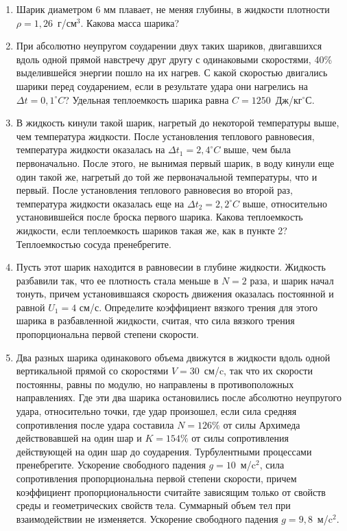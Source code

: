 
\begin{enumerate}
    \item Шарик диаметром 6 мм плавает, не меняя глубины, в жидкости плотности $\rho=1,26$~г/см$^3$. Какова масса шарика?
    \item При абсолютно неупругом соударении двух таких шариков, двигавшихся вдоль одной прямой навстречу друг другу с одинаковыми скоростями, 
    40\% выделившейся энергии пошло на их нагрев. С какой скоростью двигались шарики перед соударением, если в результате удара они нагрелись на 
    $\Delta t = 0,1^{\circ}C$? Удельная теплоемкость шарика равна $C=1250$~Дж/кг$^{\circ}$С.
    \item В жидкость кинули такой шарик, нагретый до некоторой температуры выше, чем температура жидкости. После установления теплового 
    равновесия, температура жидкости оказалась на $\Delta t_1 = 2,4^{\circ}C$ выше, чем была первоначально. После этого, не вынимая первый 
    шарик, в воду кинули еще один такой же, нагретый до той же первоначальной температуры, что и первый. После установления теплового 
    равновесия во второй раз, температура жидкости оказалась еще на $\Delta t_2 = 2,2^{\circ}C$ выше, относительно установившейся 
    после броска первого шарика. Какова теплоемкость жидкости, если теплоемкость шариков такая же, как в пункте 2? 
    Теплоемкостью сосуда пренебрегите.
    \item Пусть этот шарик находится в равновесии в глубине жидкости. Жидкость разбавили так, что ее плотность 
    стала меньше в $N = 2$ раза, и шарик начал тонуть, причем установившаяся скорость движения оказалась постоянной и равной $U_1 = 4$ см/с. 
    Определите коэффициент вязкого трения для этого шарика в разбавленной жидкости, 
    считая, что сила вязкого трения пропорциональна первой степени скорости.
    \item Два разных шарика одинакового объема движутся в жидкости вдоль одной вертикальной прямой со скоростями 
    $V = 30$~см/c, так что их скорости постоянны, равны по модулю, но направлены в противоположных направлениях. 
    Где эти два шарика остановились после абсолютно неупругого удара, относительно точки, где удар произошел, 
    если сила средняя сопротивления после удара составила $N = 126\%$ от силы Архимеда действовавшей на один шар и 
    $K = 154\%$ от силы сопротивления действующей на один шар до соударения. Турбулентными процессами пренебрегите. 
    Ускорение свободного падения $g = 10$~м/c$^2$, сила сопротивления пропорциональна первой степени скорости, 
    причем коэффициент пропорциональности считайте зависящим только от свойств среды и геометрических свойств 
    тела. Суммарный объем тел при взаимодействии не изменяется. Ускорение свободного падения $g=9,8$~м/c$^2$.   
\end{enumerate}
